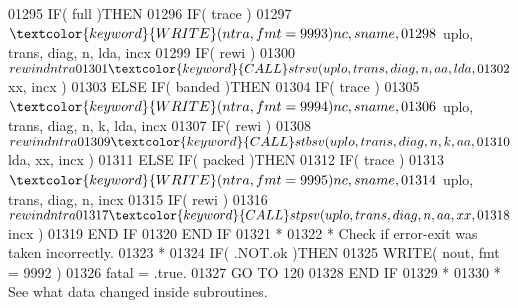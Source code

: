 \begin{DoxyCode}
01295                            \textcolor{keywordflow}{IF}( full )\textcolor{keywordflow}{THEN}
01296                               \textcolor{keywordflow}{IF}( trace )
01297      $                           \textcolor{keyword}{WRITE}( ntra, fmt = 9993 )nc, sname,
01298      $                           uplo, trans, diag, n, lda, incx
01299                               \textcolor{keywordflow}{IF}( rewi )
01300      $                           rewind ntra
01301                               \textcolor{keyword}{CALL }strsv( uplo, trans, diag, n, aa, lda,
01302      $                                    xx, incx )
01303                            \textcolor{keywordflow}{ELSE} \textcolor{keywordflow}{IF}( banded )\textcolor{keywordflow}{THEN}
01304                               \textcolor{keywordflow}{IF}( trace )
01305      $                           \textcolor{keyword}{WRITE}( ntra, fmt = 9994 )nc, sname,
01306      $                           uplo, trans, diag, n, k, lda, incx
01307                               \textcolor{keywordflow}{IF}( rewi )
01308      $                           rewind ntra
01309                               \textcolor{keyword}{CALL }stbsv( uplo, trans, diag, n, k, aa,
01310      $                                    lda, xx, incx )
01311                            \textcolor{keywordflow}{ELSE} \textcolor{keywordflow}{IF}( packed )\textcolor{keywordflow}{THEN}
01312                               \textcolor{keywordflow}{IF}( trace )
01313      $                           \textcolor{keyword}{WRITE}( ntra, fmt = 9995 )nc, sname,
01314      $                           uplo, trans, diag, n, incx
01315                               \textcolor{keywordflow}{IF}( rewi )
01316      $                           rewind ntra
01317                               \textcolor{keyword}{CALL }stpsv( uplo, trans, diag, n, aa, xx,
01318      $                                    incx )
01319 \textcolor{keywordflow}{                           END IF}
01320 \textcolor{keywordflow}{                        END IF}
01321 \textcolor{comment}{*}
01322 \textcolor{comment}{*                       Check if error-exit was taken incorrectly.}
01323 \textcolor{comment}{*}
01324                         \textcolor{keywordflow}{IF}( .NOT.ok )\textcolor{keywordflow}{THEN}
01325                            \textcolor{keyword}{WRITE}( nout, fmt = 9992 )
01326                            fatal = .true.
01327                            \textcolor{keywordflow}{GO TO} 120
01328 \textcolor{keywordflow}{                        END IF}
01329 \textcolor{comment}{*}
01330 \textcolor{comment}{*                       See what data changed inside subroutines.}

\end{DoxyCode}
